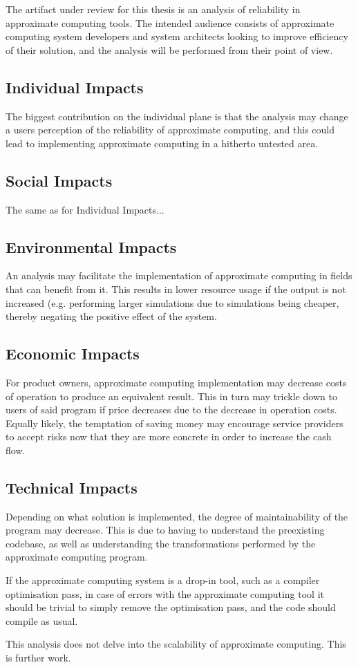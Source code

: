 The artifact under review for this thesis is an analysis of reliability in approximate computing tools. The intended audience consists of approximate computing system developers and system architects looking to improve efficiency of their solution, and the analysis will be performed from their point of view. 

\subsection{Individual Impacts}
The biggest contribution on the individual plane is that the analysis may change a users perception of the reliability of approximate computing, and this could lead to implementing approximate computing in a hitherto untested area. 


\subsection{Social Impacts}
The same as for Individual Impacts...
\subsection{Environmental Impacts}
An analysis may facilitate the implementation of approximate computing in fields that can benefit from it. This results in lower resource usage if the output is not increased (e.g. performing larger simulations due to simulations being cheaper, thereby negating the positive effect of the system.

\subsection{Economic Impacts}
For product owners, approximate computing implementation may decrease costs of operation to produce an equivalent result. This in turn may trickle down to users of said program if price decreases due to the decrease in operation costs. 
Equally likely, the temptation of saving money may encourage service providers to accept risks now that they are more concrete in order to increase the cash flow.
\subsection{Technical Impacts}
Depending on what solution is implemented, the degree of maintainability of the program may decrease. This is due to having to understand the preexisting codebase, as well as understanding the transformations performed by the approximate computing program. 

If the approximate computing system is a drop-in tool, such as a compiler optimisation pass, in case of errors with the approximate computing tool it should be trivial to simply remove the optimisation pass, and the code should compile as usual.

This analysis does not delve into the scalability of approximate computing. This is further work.
